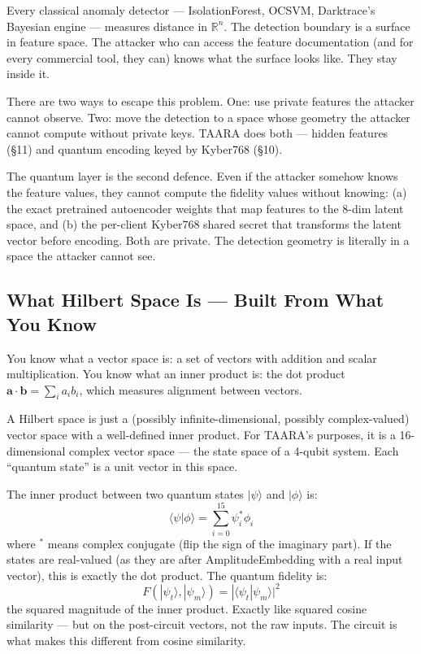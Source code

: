 \documentclass[11pt,a4paper]{article}
\newcommand{\ket}[1]{|#1\rangle}
\newcommand{\braket}[2]{\langle #1|#2\rangle}
\begin{document}
Every classical anomaly detector — IsolationForest, OCSVM, Darktrace's Bayesian engine — measures distance in $\mathbb{R}^n$. The detection boundary is a surface in feature space. The attacker who can access the feature documentation (and for every commercial tool, they can) knows what the surface looks like. They stay inside it.

There are two ways to escape this problem. One: use private features the attacker cannot observe. Two: move the detection to a space whose geometry the attacker cannot compute without private keys. TAARA does both — hidden features (\S11) and quantum encoding keyed by Kyber768 (\S10).

The quantum layer is the second defence. Even if the attacker somehow knows the feature values, they cannot compute the fidelity values without knowing: (a) the exact pretrained autoencoder weights that map features to the 8-dim latent space, and (b) the per-client Kyber768 shared secret that transforms the latent vector before encoding. Both are private. The detection geometry is literally in a space the attacker cannot see.

\subsection{What Hilbert Space Is — Built From What You Know}

You know what a vector space is: a set of vectors with addition and scalar multiplication. You know what an inner product is: the dot product $\mathbf{a} \cdot \mathbf{b} = \sum_i a_i b_i$, which measures alignment between vectors.

A Hilbert space is just a (possibly infinite-dimensional, possibly complex-valued) vector space with a well-defined inner product. For TAARA's purposes, it is a 16-dimensional complex vector space — the state space of a 4-qubit system. Each ``quantum state'' is a unit vector in this space.

The inner product between two quantum states $\ket{\psi}$ and $\ket{\phi}$ is:
\[
\braket{\psi}{\phi} = \sum_{i=0}^{15} \psi_i^* \phi_i
\]
where $^*$ means complex conjugate (flip the sign of the imaginary part). If the states are real-valued (as they are after AmplitudeEmbedding with a real input vector), this is exactly the dot product. The quantum fidelity is:
\[
F(\ket{\psi_t}, \ket{\psi_m}) = |\braket{\psi_t}{\psi_m}|^2
\]
the squared magnitude of the inner product. Exactly like squared cosine similarity — but on the post-circuit vectors, not the raw inputs. The circuit is what makes this different from cosine similarity.
\end{document}
